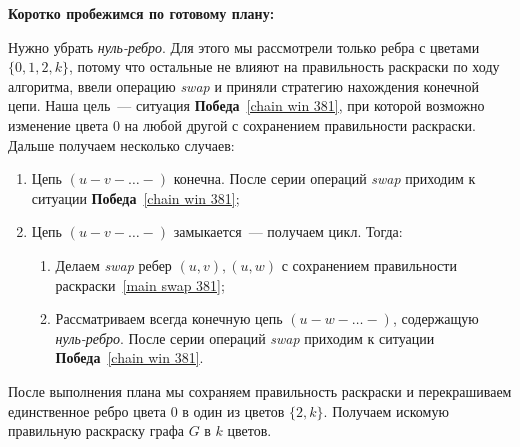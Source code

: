 \textbf{Коротко пробежимся по готовому плану:}

Нужно убрать \emph{нуль-ребро}. Для этого мы рассмотрели только ребра с цветами \(\{0, 1, 2, k\}\), потому что остальные не влияют на правильность раскраски по ходу алгоритма, ввели операцию \emph{swap} и приняли стратегию нахождения конечной цепи. Наша цель~--- ситуация \textbf{Победа}~\eqref{chain win 381}, при которой возможно изменение цвета \(0\) на любой другой с сохранением правильности раскраски. Дальше получаем несколько случаев:
\begin{enumerate}
    \item Цепь \((u-v-\ldots-)\) конечна. После серии операций \emph{swap} приходим к ситуации \textbf{Победа}~\eqref{chain win 381};
    
    \item Цепь \((u-v-\ldots-)\) замыкается~--- получаем цикл. Тогда:
    \begin{enumerate}
        \item Делаем \emph{swap} ребер \((u, v), (u, w)\) с сохранением правильности раскраски~\eqref{main swap 381};
        
        \item Рассматриваем всегда конечную цепь \((u-w-\ldots-)\), содержащую \emph{нуль-ребро}. После серии операций \emph{swap} приходим к ситуации \textbf{Победа}~\eqref{chain win 381}.
    \end{enumerate}
\end{enumerate}

После выполнения плана мы сохраняем правильность раскраски и перекрашиваем единственное ребро цвета \(0\) в один из цветов \(\{2, k\}\). Получаем искомую правильную раскраску графа \(G\) в \(k\) цветов.
